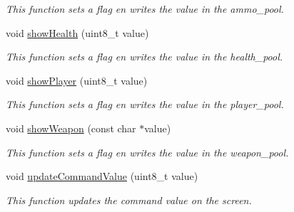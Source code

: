 \begin{DoxyCompactItemize}
\begin{DoxyCompactList}\small\item\em This function sets a flag en writes the value in the ammo\+\_\+pool. \end{DoxyCompactList}\item 
\mbox{\label{class_display_control_a4cb0b2e7b72f7267531ffb0470216651}} 
void \mbox{\hyperlink{class_display_control_a4cb0b2e7b72f7267531ffb0470216651}{show\+Health}} (uint8\+\_\+t value)
\begin{DoxyCompactList}\small\item\em This function sets a flag en writes the value in the health\+\_\+pool. \end{DoxyCompactList}\item 
\mbox{\label{class_display_control_a1f33d5376aee69c307444fef969a1870}} 
void \mbox{\hyperlink{class_display_control_a1f33d5376aee69c307444fef969a1870}{show\+Player}} (uint8\+\_\+t value)
\begin{DoxyCompactList}\small\item\em This function sets a flag en writes the value in the player\+\_\+pool. \end{DoxyCompactList}\item 
\mbox{\label{class_display_control_a4be28ed55f806917cf4cb7bab68ea6eb}} 
void \mbox{\hyperlink{class_display_control_a4be28ed55f806917cf4cb7bab68ea6eb}{show\+Weapon}} (const char $\ast$value)
\begin{DoxyCompactList}\small\item\em This function sets a flag en writes the value in the weapon\+\_\+pool. \end{DoxyCompactList}\item 
\mbox{\label{class_display_control_ae2d8d0f502941d859639fd46ddd8924b}} 
void \mbox{\hyperlink{class_display_control_ae2d8d0f502941d859639fd46ddd8924b}{update\+Command\+Value}} (uint8\+\_\+t value)
\begin{DoxyCompactList}\small\item\em This function updates the command value on the screen. \end{DoxyCompactList}\item 
\mbox{\label{class_display_control_a7a566545dbdd6834307d27de99a221d6}} 

\end{DoxyCompactItemize}

